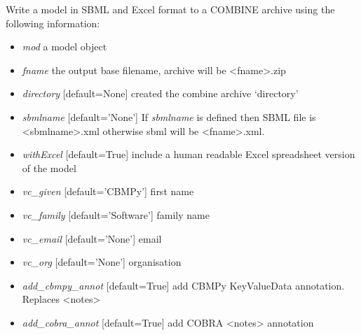 \documentclass[a4paper,11pt,english]{sphinxmanual}
\begin{document}
\begin{fulllineitems}
\label{modules_doc:cbmpy.CBWrite.writeModelToCOMBINEarchive}
Write a model in SBML and Excel format to a COMBINE archive using the following information:
\begin{itemize}
\item {} 
\emph{mod} a model object

\item {} 
\emph{fname} the output base filename, archive will be \textless{}fname\textgreater{}.zip

\item {} 
\emph{directory} {[}default=None{]} created the combine archive `directory'

\item {} 
\emph{sbmlname} {[}default='None'{]} If \emph{sbmlname} is defined then SBML file is \textless{}sbmlname\textgreater{}.xml otherwise sbml will be \textless{}fname\textgreater{}.xml.

\item {} 
\emph{withExcel} {[}default=True{]} include a human readable Excel spreadsheet version of the model

\item {} 
\emph{vc\_given} {[}default='CBMPy'{]} first name

\item {} 
\emph{vc\_family} {[}default='Software'{]} family name

\item {} 
\emph{vc\_email} {[}default='None'{]} email

\item {} 
\emph{vc\_org} {[}default='None'{]} organisation

\item {} 
\emph{add\_cbmpy\_annot} {[}default=True{]} add CBMPy KeyValueData annotation. Replaces \textless{}notes\textgreater{}

\item {} 
\emph{add\_cobra\_annot} {[}default=True{]} add COBRA \textless{}notes\textgreater{} annotation

\end{itemize}

\end{fulllineitems}
\end{document}
